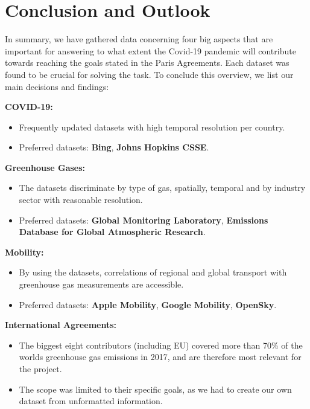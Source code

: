 \documentclass{article}
\begin{document}
\section{Conclusion and Outlook}

In summary, we have gathered data concerning four big aspects that are important for answering to what extent the Covid-19 pandemic will contribute towards reaching the  goals stated in the Paris Agreements. Each dataset was found to be crucial for solving the task. To conclude this overview, we list our main decisions and findings:

\textbf{COVID-19:}
\begin{itemize}
	\item Frequently updated datasets with high temporal resolution per country.
	\item Preferred datasets: \textbf{Bing}, \textbf{Johns Hopkins CSSE}.
\end{itemize}


\textbf{Greenhouse Gases:}
\begin{itemize}
	\item The datasets discriminate by type of gas, spatially, temporal and by industry sector with reasonable resolution.
	\item Preferred datasets: \textbf{Global Monitoring Laboratory}, \textbf{Emissions Database for Global Atmospheric Research}.
\end{itemize}

\textbf{Mobility:}
\begin{itemize}
	\item By using the datasets, correlations of regional and global transport with greenhouse gas measurements are accessible.
	\item Preferred datasets: \textbf{Apple Mobility}, \textbf{Google Mobility}, \textbf{OpenSky}.
\end{itemize}

\textbf{International Agreements:}
\begin{itemize}
	\item The biggest eight contributors (including EU) covered more than 70\% of the worlds greenhouse gas emissions in 2017, and are therefore most relevant for the project. 
	\item The scope was limited to their specific goals, as we had to create our own dataset from unformatted information.
\end{itemize}
\end{document}
